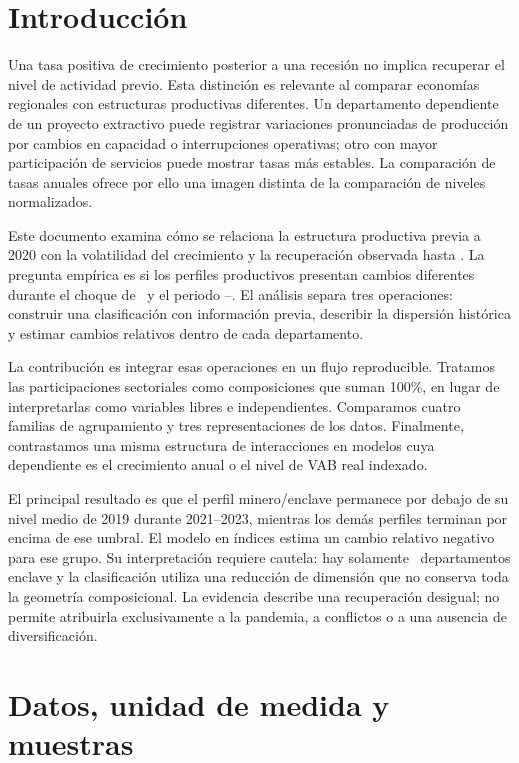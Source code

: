 \section{Introducción}
Una tasa positiva de crecimiento posterior a una recesión no implica recuperar el nivel de actividad previo. Esta distinción es relevante al comparar economías regionales con estructuras productivas diferentes. Un departamento dependiente de un proyecto extractivo puede registrar variaciones pronunciadas de producción por cambios en capacidad o interrupciones operativas; otro con mayor participación de servicios puede mostrar tasas más estables. La comparación de tasas anuales ofrece por ello una imagen distinta de la comparación de niveles normalizados.

Este documento examina cómo se relaciona la estructura productiva previa a 2020 con la volatilidad del crecimiento y la recuperación observada hasta \LevelEnd. La pregunta empírica es si los perfiles productivos presentan cambios diferentes durante el choque de \ShockYear\ y el periodo \PostStart--\PostEnd. El análisis separa tres operaciones: construir una clasificación con información previa, describir la dispersión histórica y estimar cambios relativos dentro de cada departamento.

La contribución es integrar esas operaciones en un flujo reproducible. Tratamos las participaciones sectoriales como composiciones que suman 100\%, en lugar de interpretarlas como variables libres e independientes. Comparamos cuatro familias de agrupamiento y tres representaciones de los datos. Finalmente, contrastamos una misma estructura de interacciones en modelos cuya dependiente es el crecimiento anual o el nivel de VAB real indexado.

El principal resultado es que el perfil minero/enclave permanece por debajo de su nivel medio de 2019 durante 2021--2023, mientras los demás perfiles terminan por encima de ese umbral. El modelo en índices estima un cambio relativo negativo para ese grupo. Su interpretación requiere cautela: hay solamente \EnclaveCount\ departamentos enclave y la clasificación utiliza una reducción de dimensión que no conserva toda la geometría composicional. La evidencia describe una recuperación desigual; no permite atribuirla exclusivamente a la pandemia, a conflictos o a una ausencia de diversificación.

\section{Datos, unidad de medida y muestras}
